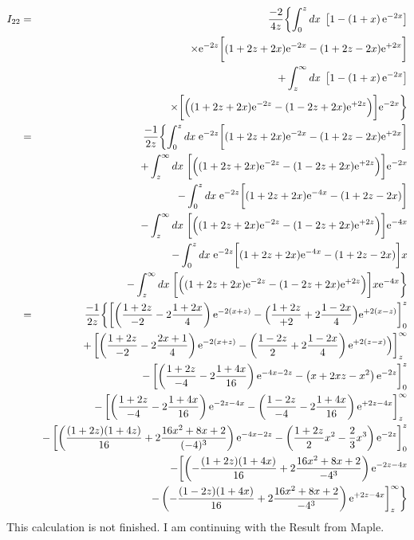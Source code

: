 \documentclass[11pt,a4paper]{report}
\begin{document}
\begin{eqnarray}
I_{22}
&=&\frac{-2}{4z}
\biggl\lbrace
\int_0^z dx\;
\left[1-\left(1+x\right)\e{-2x}\right]
\nonumber\\
&&\hspace{2cm}
\times\e{-2z}\biggl[(1+2z+2x)\e{-2x}-(1+2z-2x)\e{+2x}\biggr]
\nonumber\\
&&\hspace{0.5cm}+\int_z^\infty dx\; 
\left[1-\left(1+x\right)\e{-2x}\right]
\nonumber\\
&&\hspace{2cm}
\times\biggl[
\Bigl((1+2z+2x)\e{-2z}-(1-2z+2x)\e{+2z}\Bigr)
\biggr]\e{-2x}
\biggr\rbrace
\nonumber\\
%
%
%
&=&\frac{-1}{2z}
\biggl\lbrace
\int_0^z dx\;\e{-2z}\biggl[(1+2z+2x)\e{-2x}-(1+2z-2x)\e{+2x}\biggr]
\nonumber\\
&&\hspace{0.5cm}
+\int_z^\infty dx\; 
\biggl[\Bigl((1+2z+2x)\e{-2z}-(1-2z+2x)\e{+2z}\Bigr)\biggr]\e{-2x}
\nonumber\\
%
&&-
\int_0^z dx\;
\e{-2z}\biggl[(1+2z+2x)\e{-4x}-(1+2z-2x)\biggr]
\nonumber\\
&&\hspace{0.5cm}-\int_z^\infty dx\; 
\biggl[\Bigl((1+2z+2x)\e{-2z}-(1-2z+2x)\e{+2z}\Bigr)\biggr]\e{-4x}
\nonumber\\
%
&&-
\int_0^z dx\;
\e{-2z}\biggl[(1+2z+2x)\e{-4x}-(1+2z-2x)\biggr]x
\nonumber\\
&&\hspace{0.5cm}-\int_z^\infty dx\; 
\biggl[\Bigl((1+2z+2x)\e{-2z}-(1-2z+2x)\e{+2z}\Bigr)\biggr]x\e{-4x}
\biggr\rbrace
\nonumber\\
%
%
%
&=&\frac{-1}{2z}
\biggl\lbrace
\biggl[\left(\frac{1+2z}{-2}-2\frac{1+2x}{4}\right)\e{-2(x+z)}
-\Bigl(\frac{1+2z}{+2}+2\frac{1-2x}{4}\Bigr)\e{+2(x-z)}\biggr]_0^z
\nonumber\\
&&\hspace{0.5cm}
+\left[
\left(\frac{1+2z}{-2}-2\frac{2x+1}{4}\right)\e{-2(x+z)}
-\left(\frac{1-2z}{2}+2\frac{1-2x}{4}\right)\e{+2(z-x)}\Bigr)
\right]_z^\infty
\nonumber\\
%
&&-
\left[\left(\frac{1+2z}{-4}-2\frac{1+4x}{16}\right)\e{-4x-2z}
-\left(x+2xz-x^2\right)\e{-2z}\right]_0^z
\nonumber\\
&&\hspace{0.5cm}
-
\left[\left(\frac{1+2z}{-4}-2\frac{1+4x}{16}\right)\e{-2z-4x}
-\left(\frac{1-2z}{-4}-2\frac{1+4x}{16}\right)\e{+2z-4x}
\right]_z^\infty
\nonumber\\
%
&&-
\left[
 \left(\frac{(1+2z)(1+4z)}{16}+2\frac{16x^2+8x+2}{(-4)^3}\right)\e{-4x-2z}
-\left(\frac{1+2z}{2}x^2-\frac{2}{3}x^3\right)\e{-2z}\right]_0^z
\nonumber\\
&&-
\biggl[
 \left(-\frac{(1+2z)(1+4x)}{16}+2\frac{16x^2+8x+2}{-4^3}\right)\e{-2z-4x}
\nonumber\\
&&\hspace{2cm}
-\left(-\frac{(1-2z)(1+4x)}{16}+2\frac{16x^2+8x+2}{-4^3}\right)\e{+2z-4x}
\biggr]_z^\infty
\biggr\rbrace
\end{eqnarray}
This calculation is not finished. I am continuing with the Result from Maple.
\end{document}
